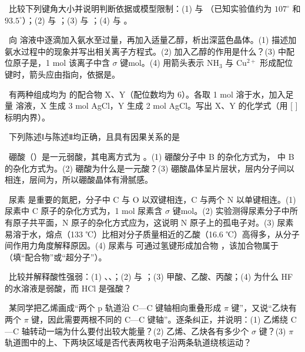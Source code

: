 \begin{xiti}
\item {}\ 比较下列键角大小并说明判断依据或模型限制：(1)  与 （已知实验值约为 $107^\circ$ 和 $93.5^\circ$）；(2)  与 ；(3)  与 ；(4)  与 。

\item {}\ 向  溶液中逐滴加入氨水至过量，再加入适量乙醇，析出深蓝色晶体。(1) 描述加氨水过程中的现象并写出相关离子方程式。(2) 加入乙醇的作用是什么？(3)  中配位原子是\tk，1 mol 该离子中含 $\sigma$ 键\tk mol。(4) 用箭头表示 NH$_3$ 与 Cu$^{2+}$ 形成配位键时，箭头应由\tk{}指向\tk，依据是\tk。

\item {}\ 有两种组成均为  的配合物 X、Y（配位数均为 6）。各取 1 mol 溶于水，加入足量  溶液，X 生成 3 mol AgCl，Y 生成 2 mol AgCl。写出 X、Y 的化学式（用 [ ] 标明内界）。

\item {}\ 下列陈述Ⅰ与陈述Ⅱ均正确，且具有因果关系的是\xz
{}

\item {}\ 硼酸（）是一元弱酸，其电离方式为 。(1) 硼酸分子中 B 的杂化方式为\tk，\ce{[B(OH)4]-} 中 B 的杂化方式为\tk。(2) 硼酸为什么是一元酸？(3) 硼酸晶体呈片层状，层内分子间以\tk{}相连，层间为\tk，所以硼酸晶体有滑腻感。
\end{xiti}

\begin{xiti}
\item {}\ 尿素  是重要的氮肥，分子中 C 与 O 以双键相连，C 与两个 N 以单键相连。(1) 尿素中 C 原子的杂化方式为\tk，1 mol 尿素含 $\sigma$ 键\tk mol。(2) 实验测得尿素分子中所有原子共平面，N 原子的杂化方式应为\tk，这说明 N 原子上的孤电子对\tk。(3) 尿素易溶于水，熔点（133 ℃）比相对分子质量相近的乙酸（16.6 ℃）高得多，从分子间作用力角度解释原因。(4) 尿素与  可通过氢键形成加合物 ，该加合物属于\tk（填“配合物”或“超分子”）。

\item {}\ 比较并解释酸性强弱：(1) 、、；(2)  与 ；(3) 甲酸、乙酸、丙酸；(4) 为什么 HF 的水溶液是弱酸，而 HCl 是强酸？
\item {}\ 某同学把乙烯画成“两个 p 轨道沿 C—C 键轴相向重叠形成 $\pi$ 键”，又说“乙炔有两个 $\pi$ 键，因此需要两根不同的 C—C 键轴”。逐条纠正，并说明：(1) 乙烯绕 C—C 轴转动一端为什么要付出较大能量？(2) 乙烯、乙炔各有多少个 $\sigma$ 键？(3) $\pi$ 轨道图中的上、下两块区域是否代表两枚电子沿两条轨道绕核运动？
\end{xiti}

